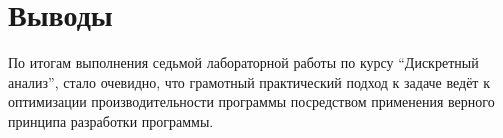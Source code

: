 \section{Выводы}

По итогам выполнения седьмой лабораторной работы по курсу \enquote{Дискретный анализ}, стало очевидно, что грамотный практический подход к задаче ведёт к оптимизации производительности программы посредством применения верного принципа разработки программы. 

\pagebreak
